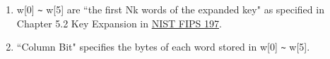 \documentclass[main\_\_EN.tex]{subfiles}
\begin{document}
\begin{landscape}
\begin{tiny}
\begin{tiplisting}
\vspace{-2.5em}
\begin{enumerate}
\item w[0] \verb+~+ w[5] are ``the first Nk words of the expanded key" as specified in Chapter 5.2 Key Expansion in \href{https://nvlpubs.nist.gov/nistpubs/FIPS/NIST.FIPS.197.pdf}{NIST FIPS 197}.
\item ``Column Bit" specifies the bytes of each word stored in w[0] \verb+~+ w[5].
\end{enumerate}
\end{tiplisting}



\newpage


\end{tiny}
\end{landscape}
\end{document}
